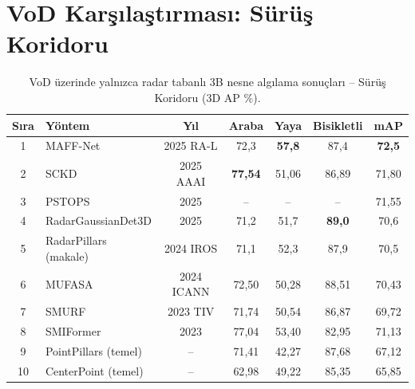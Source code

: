 \documentclass[a4paper,11pt]{article}
\newcommand{\best}[1]{\textcolor{bestcolor}{\textbf{#1}}}
\begin{document}
\section{VoD Karşılaştırması: Sürüş Koridoru}

\begin{table}[H]
\centering
\caption{VoD üzerinde yalnızca radar tabanlı 3B nesne algılama sonuçları -- Sürüş Koridoru (3D AP \%).}
\label{tab:dc}
\small
\renewcommand{\arraystretch}{1.15}
\begin{tabular}{@{}clccccc@{}}
\toprule
\textbf{Sıra} & \textbf{Yöntem} & \textbf{Yıl} & \textbf{Araba} & \textbf{Yaya} & \textbf{Bisikletli} & \textbf{mAP} \\
\midrule
1  & MAFF-Net \cite{maffnet}                & 2025 RA-L  & 72{,}3          & \best{57{,}8}   & 87{,}4          & \best{72{,}5} \\
2  & SCKD \cite{sckd}                       & 2025 AAAI  & \best{77{,}54}  & 51{,}06         & 86{,}89         & 71{,}80 \\
3  & PSTOPS \cite{pstops}                   & 2025       & --              & --              & --              & 71{,}55 \\
4  & RadarGaussianDet3D \cite{rgd3d}        & 2025       & 71{,}2          & 51{,}7          & \best{89{,}0}   & 70{,}6 \\
5  & RadarPillars (makale) \cite{radarpillars}& 2024 IROS & 71{,}1          & 52{,}3          & 87{,}9          & 70{,}5 \\
6  & MUFASA \cite{mufasa}                   & 2024 ICANN & 72{,}50         & 50{,}28         & 88{,}51         & 70{,}43 \\
7  & SMURF \cite{smurf}                     & 2023 TIV   & 71{,}74         & 50{,}54         & 86{,}87         & 69{,}72 \\
8  & SMIFormer \cite{smiformer}             & 2023       & 77{,}04         & 53{,}40         & 82{,}95         & 71{,}13 \\
9  & PointPillars (temel)                   & --         & 71{,}41         & 42{,}27         & 87{,}68         & 67{,}12 \\
10 & CenterPoint (temel)                    & --         & 62{,}98         & 49{,}22         & 85{,}35         & 65{,}85 \\
\bottomrule
\end{tabular}
\end{table}

\end{document}

